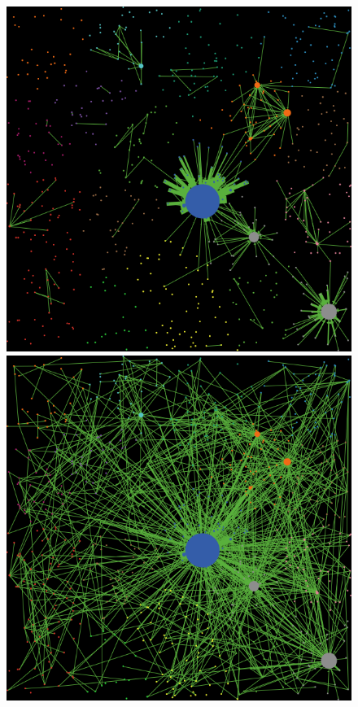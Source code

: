 \documentclass[10pt,letterpaper]{article}
\begin{document}
\begin{figure}
\vspace{-2cm}
\begin{center}
    \begin{minipage}[c]{0.25\textwidth}
        \includegraphics[width=\textwidth]{figures/ex_alleq-lowgravity_seed-12102_t1500.png}\\
        \includegraphics[width=\textwidth]{figures/ex_alleq-highgravity_seed-12102_t1500.png}

\end{minipage}
\end{center}
\end{figure}
\end{document}
